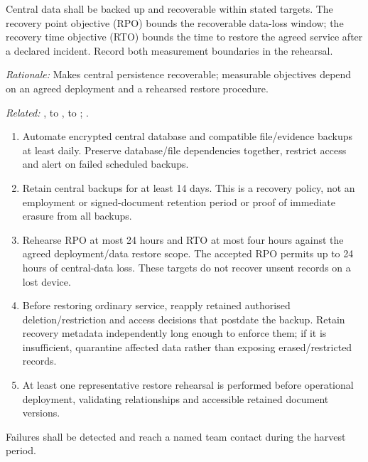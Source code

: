 \label{nfr:REL-04}
Central data shall be backed up and recoverable within stated targets.
The recovery point objective (RPO) bounds the recoverable data-loss window;
the recovery time objective (RTO) bounds the time to restore the agreed service
after a declared incident. Record both measurement boundaries in the rehearsal.

\textit{Rationale:} Makes central persistence recoverable; measurable objectives depend on an agreed deployment and a rehearsed restore procedure.

\textit{Related:} \hyperref[fr:003]{}, \hyperref[fr:038]{} to \hyperref[fr:045]{}, \hyperref[fr:046]{} to \hyperref[fr:062]{}; \hyperref[br:026]{}.
\begin{enumerate}[label=(\alph*),leftmargin=*,itemsep=1pt,topsep=3pt]
\item Automate encrypted central database and compatible file/evidence backups at least daily. Preserve database/file dependencies together, restrict access and alert on failed scheduled backups.
\item Retain central backups for at least 14 days. This is a recovery policy, not an employment or signed-document retention period or proof of immediate erasure from all backups.
\item Rehearse RPO at most 24 hours and RTO at most four hours against the agreed deployment/data restore scope. The accepted RPO permits up to 24 hours of central-data loss. These targets do not recover unsent records on a lost device.
\item Before restoring ordinary service, reapply retained authorised deletion/restriction and access decisions that postdate the backup. Retain recovery metadata independently long enough to enforce them; if it is insufficient, quarantine affected data rather than exposing erased/restricted records.
\item At least one representative restore rehearsal is performed before operational deployment, validating relationships and accessible retained document versions.
\end{enumerate}

\label{nfr:REL-05}
Failures shall be detected and reach a named team contact during the harvest period.

